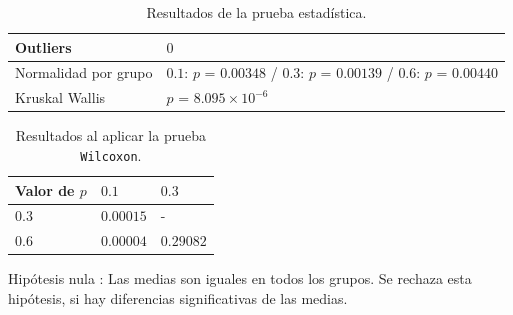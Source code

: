 \documentclass{article}
\begin{document}
\begin{table}[h!]
\centering
\caption{Resultados de la prueba estadística.}
\smallskip

\begin{tabular}{ |p{4cm}|p{8cm}|}
 \hline
 Outliers & $0$ \\
 \hline
 Normalidad por grupo & $0.1$: $p$ = $0.00348$ / $0.3$: $p$ = $0.00139$ / $0.6$: $p$ = $0.00440$ \\
 \hline
 Kruskal Wallis & $p$ = $8.095\times 10^{-6}$ \\
 \hline
\end{tabular}
\label{Cuadro1}
\end{table}

\begin{table}[h!]
\centering
\caption{Resultados al aplicar la prueba \texttt{Wilcoxon}.}
\smallskip

\begin{tabular}{|p{1.7cm}|p{1.7cm}|p{1.7cm}|}
 \hline
Valor de $p$ & $0.1$ & $0.3$ \\
 \hline
 $0.3$ & $0.00015$ & -   \\
 \hline
 $0.6$ & $0.00004$ & $0.29082$  \\
 \hline
\end{tabular}
\label{Cuadro2}
\end{table}

Hipótesis nula : Las medias son iguales en todos los grupos. Se rechaza esta hipótesis, si hay diferencias significativas de las medias.
\end{document}
